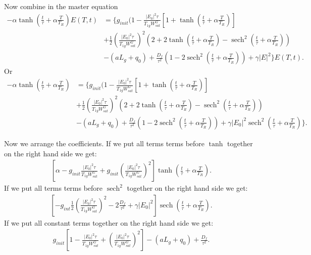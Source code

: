 \documentclass[preprint,secnumarabic,amssymb, nobibnotes, aip, prd]{revtex4-1}
\DeclareMathOperator{\sech}{sech}
\begin{document}
Now combine in the master equation 
\begin{align}
\label{eq:master-equation2}
-\alpha \tanh(\frac{t}{\tau}+\alpha \frac{T}{T_R}) E(T,t) &=  \{ g_{init}(1 - \frac{|E_0|^2\tau}{T_{1g}W_{sat}^G} [1+\tanh(\frac{t}{\tau}+\alpha \frac{T}{T_R})]  \nonumber \\
&  +\frac{1}{2} \left(\frac{|E_0|^2\tau}{T_{1g}W_{sat}^G}\right)^2 \left(2+2\tanh(\frac{t}{\tau}+\alpha \frac{T}{T_R}) - \sech^2(\frac{t}{\tau}+\alpha \frac{T}{T_R})\right)  \nonumber \\
&  -(aL_g+q_0)  + \frac{D_f}{\tau^2}\left( 1-2\sech^2(\frac{t}{\tau}+\alpha \frac{T}{T_R}) \right) + \gamma |E|^2  \}E(T,t).
\end{align}
Or 
\begin{align}
\label{eq:master-equation3}
-\alpha \tanh(\frac{t}{\tau}+\alpha \frac{T}{T_R}) &=  \{ g_{init}(1 - \frac{|E_0|^2\tau}{T_{1g}W_{sat}^G} [1+\tanh(\frac{t}{\tau}+\alpha \frac{T}{T_R})]  \nonumber \\
&  +\frac{1}{2} \left(\frac{|E_0|^2\tau}{T_{1g}W_{sat}^G}\right)^2 \left(2+2\tanh(\frac{t}{\tau}+\alpha \frac{T}{T_R}) - \sech^2(\frac{t}{\tau}+\alpha \frac{T}{T_R})\right)  \nonumber \\
&  -(aL_g+q_0)  + \frac{D_f}{\tau^2}\left( 1-2\sech^2(\frac{t}{\tau}+\alpha \frac{T}{T_R}) \right) + \gamma |E_0|^2\sech^2(\frac{t}{\tau}+\alpha \frac{T}{T_R})  \}.
\end{align}

Now we arrange the coefficients. If we put all terms terms before $\tanh $ together on the right hand side we get:
\begin{align}
\label{eq:coefs1}
\left[\alpha -g_{init}\frac{|E_0|^2\tau}{T_{1g}W_{sat}^G} +g_{init}\left(\frac{|E_0|^2\tau}{T_{1g}W_{sat}^G}\right)^2 \right]\tanh(\frac{t}{\tau}+\alpha \frac{T}{T_R}).
\end{align}
If we put all terms terms before $\sech^2 $ together on the right hand side we get:
\begin{align}
\label{eq:coefs2}
\left[ -g_{int}\frac{1}{2}\left(\frac{|E_0|^2\tau}{T_{1g}W_{sat}^G}\right)^2 - 2\frac{D_f}{\tau^2} +\gamma|E_0|^2\right]\sech(\frac{t}{\tau}+\alpha \frac{T}{T_R}).
\end{align}
If we put all constant terms together on the right hand side we get:
\begin{align}
\label{eq:coefs3}
g_{init}\left[1-\frac{|E_0|^2\tau}{T_{1g}W_{sat}^G}+\left(\frac{|E_0|^2\tau}{T_{1g}W_{sat}^G}\right)^2 \right] -(aL_g+q_0) + \frac{D_f}{\tau^2}.
\end{align}
\end{document}
